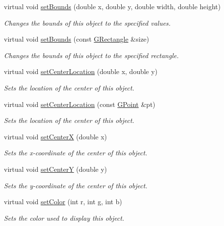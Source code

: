 \begin{DoxyCompactItemize}
virtual void \mbox{\hyperlink{classGObject_a2aae8197624b72265ab83b4f1bc73f2f}{set\+Bounds}} (double x, double y, double width, double height)
\begin{DoxyCompactList}\small\item\em Changes the bounds of this object to the specified values. \end{DoxyCompactList}\item 
virtual void \mbox{\hyperlink{classGObject_acada386653f008cacc7cce86426bef7c}{set\+Bounds}} (const \mbox{\hyperlink{classGRectangle}{G\+Rectangle}} \&size)
\begin{DoxyCompactList}\small\item\em Changes the bounds of this object to the specified rectangle. \end{DoxyCompactList}\item 
virtual void \mbox{\hyperlink{classGObject_a290b47dd8de1be44089f95cb2c47c1de}{set\+Center\+Location}} (double x, double y)
\begin{DoxyCompactList}\small\item\em Sets the location of the center of this object. \end{DoxyCompactList}\item 
virtual void \mbox{\hyperlink{classGObject_a1bedf1b233ecba3f753ec58908a683a6}{set\+Center\+Location}} (const \mbox{\hyperlink{classGPoint}{G\+Point}} \&pt)
\begin{DoxyCompactList}\small\item\em Sets the location of the center of this object. \end{DoxyCompactList}\item 
virtual void \mbox{\hyperlink{classGObject_a2f4936281e056eead00a9186b9ba8af6}{set\+CenterX}} (double x)
\begin{DoxyCompactList}\small\item\em Sets the x-\/coordinate of the center of this object. \end{DoxyCompactList}\item 
virtual void \mbox{\hyperlink{classGObject_aad2a22b4fde88c33306b92aebf641d57}{set\+CenterY}} (double y)
\begin{DoxyCompactList}\small\item\em Sets the y-\/coordinate of the center of this object. \end{DoxyCompactList}\item 
virtual void \mbox{\hyperlink{classGObject_ad57ef49bc31db94e92648aa3737923d6}{set\+Color}} (int r, int g, int b)
\begin{DoxyCompactList}\small\item\em Sets the color used to display this object. \end{DoxyCompactList}\item 

\end{DoxyCompactItemize}
